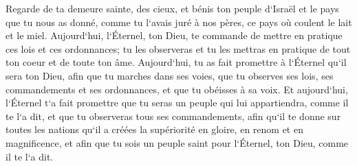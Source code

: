 \verse Regarde de ta demeure sainte, des cieux, et bénis ton peuple d`Israël et le pays que tu nous as donné, comme tu l`avais juré à nos pères, ce pays où coulent le lait et le miel. 
\verse Aujourd`hui, l`Éternel, ton Dieu, te commande de mettre en pratique ces lois et ces ordonnances; tu les observeras et tu les mettras en pratique de tout ton coeur et de toute ton âme. 
\verse Aujourd`hui, tu as fait promettre à l`Éternel qu`il sera ton Dieu, afin que tu marches dans ses voies, que tu observes ses lois, ses commandements et ses ordonnances, et que tu obéisses à sa voix. 
\verse Et aujourd`hui, l`Éternel t`a fait promettre que tu seras un peuple qui lui appartiendra, comme il te l`a dit, et que tu observeras tous ses commandements, 
\verse afin qu`il te donne sur toutes les nations qu`il a créées la supériorité en gloire, en renom et en magnificence, et afin que tu sois un peuple saint pour l`Éternel, ton Dieu, comme il te l`a dit. 

\chapter{}


